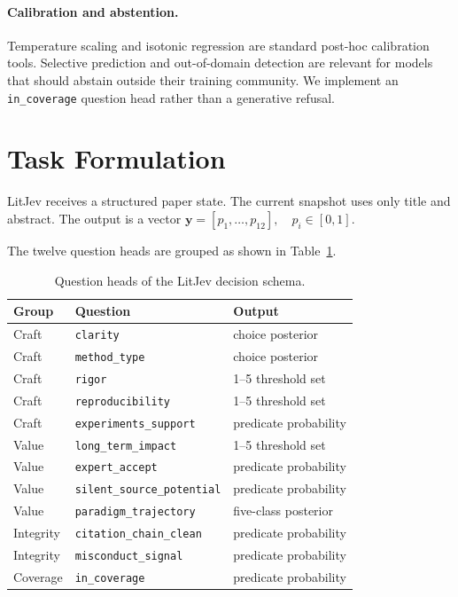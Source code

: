 \documentclass[11pt]{article}
\begin{document}
\paragraph{Calibration and abstention.}
Temperature scaling and isotonic regression are standard post-hoc calibration
tools. Selective prediction and out-of-domain detection are relevant for models
that should abstain outside their training community. We implement an
\texttt{in\_coverage} question head rather than a generative refusal.

\section{Task Formulation}

LitJev receives a structured paper state. The current snapshot uses only title
and abstract. The output is a vector
\(
  \mathbf{y}=[p_1,\dots,p_{12}],\quad p_i\in[0,1].
\)

The twelve question heads are grouped as shown in
Table~\ref{tab:schema}.

\begin{table}[t]
\centering
\begin{tabular}{@{}lll@{}}
\toprule
Group & Question & Output \\
\midrule
Craft & \texttt{clarity} & choice posterior \\
Craft & \texttt{method\_type} & choice posterior \\
Craft & \texttt{rigor} & 1--5 threshold set \\
Craft & \texttt{reproducibility} & 1--5 threshold set \\
Craft & \texttt{experiments\_support} & predicate probability \\
Value & \texttt{long\_term\_impact} & 1--5 threshold set \\
Value & \texttt{expert\_accept} & predicate probability \\
Value & \texttt{silent\_source\_potential} & predicate probability \\
Value & \texttt{paradigm\_trajectory} & five-class posterior \\
Integrity & \texttt{citation\_chain\_clean} & predicate probability \\
Integrity & \texttt{misconduct\_signal} & predicate probability \\
Coverage & \texttt{in\_coverage} & predicate probability \\
\bottomrule
\end{tabular}
\caption{Question heads of the LitJev decision schema.}
\label{tab:schema}
\end{table}
\end{document}
